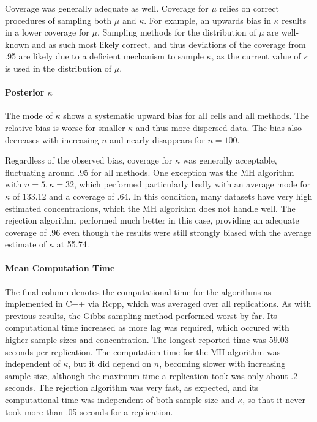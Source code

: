 \documentclass[]{gSCS2e}
\theoremstyle{plain}
\theoremstyle{definition}
\theoremstyle{remark}
\begin{document}
Coverage was generally adequate as well. Coverage for $\mu$ relies on correct procedures of sampling both $\mu$ and $\kappa$. For example, an upwards bias in $\kappa$ results in a lower coverage for $\mu$. Sampling methods for the distribution of $\mu$ are well-known and as such most likely correct, and thus deviations of the coverage from .95 are likely due to a deficient mechanism to sample $\kappa$, as the current value of $\kappa$ is used in the distribution of $\mu$.



\paragraph{Posterior $\kappa$}

The mode of $\kappa$ shows a systematic upward bias for all cells and all methods. The relative bias is worse for smaller $\kappa$ and thus more dispersed data. The bias also decreases with increasing $n$ and nearly disappears for $n = 100$. 

Regardless of the observed bias, coverage for $\kappa$ was generally acceptable, fluctuating around .95 for all methods. One exception was the MH algorithm with $n=5, \kappa=32$, which performed particularly badly with an average mode for $\kappa$ of 133.12 and a coverage of .64. In this condition, many datasets have very high estimated concentrations, which the MH algorithm does not handle well. The rejection algorithm performed much better in this case, providing an adequate coverage of .96 even though the results were still strongly biased with the average estimate of $\kappa$ at 55.74. 

\paragraph{Mean Computation Time}

The final column denotes the computational time for the algorithms as implemented in C++ via Rcpp, which was averaged over all replications. As with previous results, the Gibbs sampling method performed worst by far. Its computational time increased as more lag was required, which occured with higher sample sizes and concentration. The longest reported time was 59.03 seconds per replication. The computation time for the MH algorithm was independent of $\kappa$, but it did depend on $n$, becoming slower with increasing sample size, although the maximum time a replication took was only about .2 seconds. The rejection algorithm was very fast, as expected, and its computational time was independent of both sample size and $\kappa$, so that it never took more than .05 seconds for a replication. 
\end{document}
